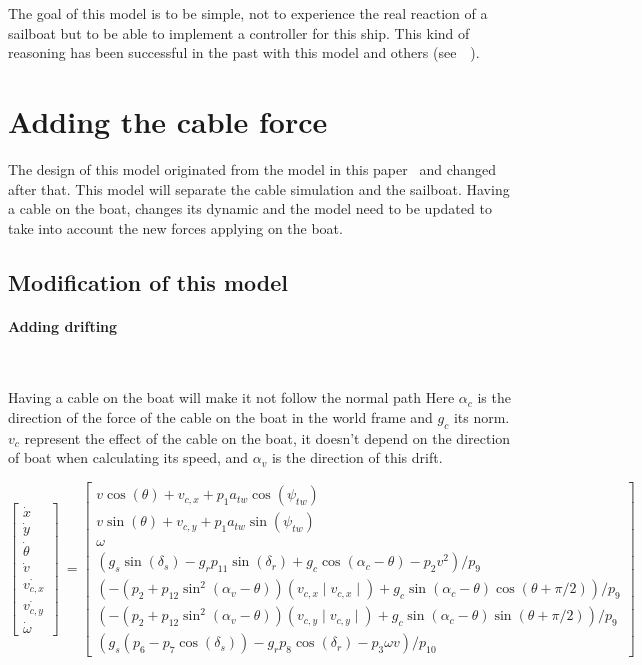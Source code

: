 The goal of this model is to be simple, not to experience the real reaction of a sailboat but
to be able to implement a controller for this ship. This kind of reasoning has been successful in the past 
with this model and others (see~\cite{LeBars2013}~\cite{Melin2016}).

\section{Adding the cable force}

The design of this model originated from the model in this paper~\cite{Jaulin2015} and changed after that.
This model will separate the cable simulation and the sailboat. Having a cable on the boat, changes its dynamic 
and the model need to be updated to take into account the new forces applying on the boat.
\subsection{Modification of this model}
\paragraph*{Adding drifting}
~\\
\hskip7mm 

Having a cable on the boat will make it not follow the normal path 
Here $\alpha_{c}$ is the direction of the force of the cable on the boat in the world frame and $g_c$ its norm.
$v_c$ represent the effect of the cable on the boat, it doesn't depend on the direction of boat when calculating its speed, and $\alpha_{v}$ is the direction of this drift. 


\begin{equation}
\begin{bmatrix}
\dot{x}\\
\dot{y}\\
\dot{\theta}\\
\dot{v}\\
\dot{v_{c,x}}\\
\dot{v_{c,y}}\\
\dot{\omega}
\end{bmatrix}\  = \begin{bmatrix}
v \cos(\theta)+v_{c,x}+p_1 a_{tw} \cos(\psi_{tw})\\
v \sin(\theta)+v_{c,y}+p_1 a_{tw} \sin(\psi_{tw})\\
\omega\\
(g_s \sin(\delta_s)-g_r p_{11} \sin(\delta_r)+ g_c \cos(\alpha_c-\theta) - p_2 v^2)/p_9\\
(-(p_2+p_{12} \sin^2(\alpha_v-\theta))(v_{c,x} \mid v_{c,x} \mid ) + g_c \sin(\alpha_{c} -\theta) \cos(\theta+\pi/2))/p_9\\
(-(p_2+p_{12} \sin^2(\alpha_v-\theta))(v_{c,y} \mid v_{c,y} \mid ) + g_c \sin(\alpha_{c} -\theta) \sin(\theta+\pi/2))/p_9\\
(g_s(p_6-p_7\cos(\delta_s))-g_r p_8 \cos(\delta_r)-p_3 \omega v)/p_{10}
\end{bmatrix}
\end{equation}

